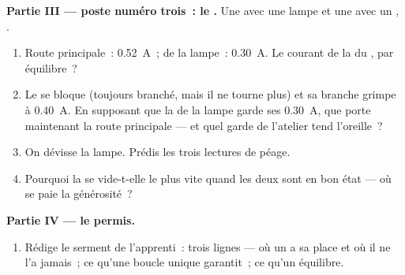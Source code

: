 \begin{problem}
\medskip\noindent\textbf{Partie III --- poste numéro trois~: le
.}
Une  avec une lampe et une  avec un , .
\begin{enumerate}[resume]
  \item Route principale~: \qty{0.52}{A}~;  de la lampe~:
        \qty{0.30}{A}. Le courant de la  du , par
        équilibre~?
  \item Le  se bloque (toujours branché, mais il ne tourne
        plus) et sa branche grimpe à \qty{0.40}{A}. En supposant
        que la  de la lampe garde ses \qty{0.30}{A}, que
        porte maintenant la route principale --- et quel garde de
        l'atelier tend l'oreille~?
  \item On dévisse la lampe. Prédis les trois lectures de péage.
  \item Pourquoi la  se vide-t-elle le plus vite quand les deux
         sont en bon état --- où se paie la générosité~?
\end{enumerate}

\medskip\noindent\textbf{Partie IV --- le permis.}
\begin{enumerate}[resume]
  \item Rédige le serment de l'apprenti~: trois lignes --- où un
         a sa place et où il ne l'a jamais~; ce qu'une
        boucle unique garantit~; ce qu'un  équilibre.
\end{enumerate}
\end{problem}

